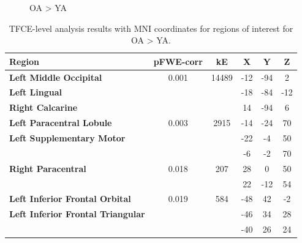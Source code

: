 \documentclass[a4paper,fleqn]{cas-sc}
\begin{document}
\begin{figure}[ht]
\begin{minipage}{0.48\textwidth}
         \label{fig:b}
    \end{minipage}
    \caption{OA > YA}
    \label{fig:AgexCon_Slice}
\end{figure}


\begin{table}[h!]
\centering
\begin{tabular}{|l|c|c|c|c|c|}
\hline
\rowcolor[HTML]{D0D0D0} 
\textbf{Region}                     & \textbf{pFWE-corr} & \textbf{kE}  & \textbf{X}   & \textbf{Y}   & \textbf{Z}   \\ \hline
\textbf{Left Middle Occipital}      & 0.001             & 14489        & -12          & -94          & 2           \\ 
\textbf{Left Lingual}               &                   &              & -18          & -84          & -12         \\ 
\textbf{Right Calcarine}            &                   &              & 14           & -94          & 6           \\ \hline
\textbf{Left Paracentral Lobule}    & 0.003             & 2915         & -14          & -24          & 70          \\ 
\textbf{Left Supplementary Motor}   &                   &              & -22          & -4           & 50          \\ 
                                     &                   &              & -6           & -2           & 70          \\ \hline
\textbf{Right Paracentral}          & 0.018             & 207          & 28           & 0            & 50          \\ 
                                     &                   &              & 22           & -12          & 54          \\ \hline
\textbf{Left Inferior Frontal Orbital} & 0.019          & 584          & -48          & 42           & -2          \\ 
\textbf{Left Inferior Frontal Triangular} &             &              & -46          & 34           & 28          \\ 
                                     &                   &              & -40          & 26           & 24          \\ \hline
\end{tabular}
\caption{TFCE-level analysis results with MNI coordinates for regions of interest  for OA > YA.}
\label{tab:tfce_results}
\end{table}
\end{document}

